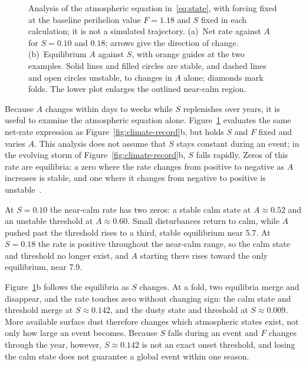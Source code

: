 \begin{figure}
  \centering
  \caption{Analysis of the atmospheric equation in~\eqref{eq:state}, with forcing fixed at the baseline perihelion value $F = 1.18$ and $S$ fixed in each calculation; it is not a simulated trajectory. (a)~Net rate against $A$ for $S = 0.10$ and $0.18$; arrows give the direction of change. (b)~Equilibrium $A$ against $S$, with orange guides at the two examples. Solid lines and filled circles are stable, and dashed lines and open circles unstable, to changes in $A$ alone; diamonds mark folds. The lower plot enlarges the outlined near-calm region.}
  \label{fig:storm-switch}
\end{figure}
Because $A$ changes within days to weeks while $S$ replenishes over years, it is useful to examine the atmospheric equation alone. Figure~\ref{fig:storm-switch} evaluates the same net-rate expression as Figure~\ref{fig:climate-record}b, but holds $S$ and $F$ fixed and varies $A$. This analysis does not assume that $S$ stays constant during an event; in the evolving storm of Figure~\ref{fig:climate-record}b, $S$ falls rapidly. Zeros of this rate are equilibria: a zero where the rate changes from positive to negative as $A$ increases is stable, and one where it changes from negative to positive is unstable~\cite{strogatz2015}.

At $S = 0.10$ the near-calm rate has two zeros: a stable calm state at $A \approx 0.52$ and an unstable threshold at $A \approx 0.60$. Small disturbances return to calm, while $A$ pushed past the threshold rises to a third, stable equilibrium near 5.7. At $S = 0.18$ the rate is positive throughout the near-calm range, so the calm state and threshold no longer exist, and $A$ starting there rises toward the only equilibrium, near 7.9.

Figure~\ref{fig:storm-switch}b follows the equilibria as $S$ changes. At a fold, two equilibria merge and disappear, and the rate touches zero without changing sign: the calm state and threshold merge at $S \approx 0.142$, and the dusty state and threshold at $S \approx 0.009$. More available surface dust therefore changes which atmospheric states exist, not only how large an event becomes. Because $S$ falls during an event and $F$ changes through the year, however, $S \approx 0.142$ is not an exact onset threshold, and losing the calm state does not guarantee a global event within one season.

